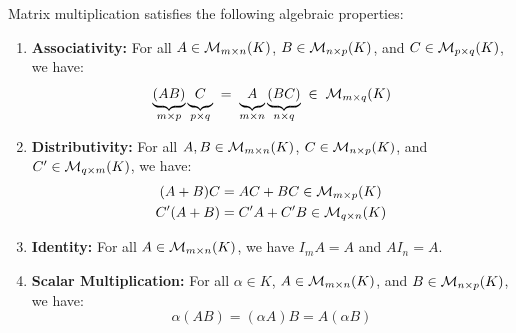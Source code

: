 \begin{proposition} 
\label{prop:matrix_multiplication_properties}
Matrix multiplication satisfies the following algebraic properties:
\begin{enumerate}[label=\textbf{(\alph*)}]
    \item \textbf{Associativity:} For all $A \in \mathcal{M}_{m \times n}(K)$, $B \in \mathcal{M}_{n \times p}(K)$, and $C \in \mathcal{M}_{p \times q}(K)$, we have:
    \begin{equation*}
        \underbrace{(AB)}_{m \times p} \underbrace{\vphantom{(}C}_{p \times q}
        \;=\; \underbrace{\vphantom{(}A}_{m \times n} \underbrace{(BC)}_{n \times q}
        \;\in\; \mathcal{M}_{m \times q}(K)
    \end{equation*}
    \item \textbf{Distributivity:} For all $A, B \in \mathcal{M}_{m \times n}(K)$, $C \in \mathcal{M}_{n \times p}(K)$, and $C' \in \mathcal{M}_{q \times m}(K)$, we have:
    \begin{align*}
        (A + B)C &= AC + BC \in \mathcal{M}_{m \times p}(K) \\
        C'(A + B) &= C'A + C'B \in \mathcal{M}_{q \times n}(K)
    \end{align*}
    \item \textbf{Identity:} For all $A \in \mathcal{M}_{m \times n}(K)$, we have $I_m A = A$ and $A I_n = A$.
    \item \textbf{Scalar Multiplication:} For all $\alpha \in K$, $A \in \mathcal{M}_{m \times n}(K)$, and $B \in \mathcal{M}_{n \times p}(K)$, we have:
    \begin{equation*}
        \alpha(AB) = (\alpha A)B = A(\alpha B)
    \end{equation*}
\end{enumerate}
\end{proposition}

